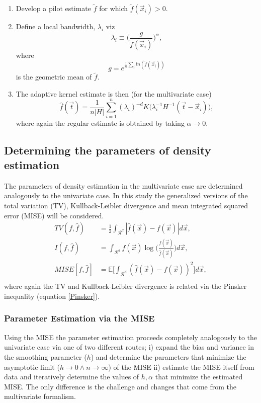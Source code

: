 \documentclass[
twoside,
openright,
titlepage,
numbers=noenddot,
headinclude,%
footinclude=true,
dottedtoc, %
ngerman,
american, %
pagesize=pdftex,
]{book}
\begin{document}
	\begin{enumerate}
		\item Develop a pilot estimate $\tilde{f}$ for which $\tilde{f}(\vec{x}_i)>0$.
		\item Define a local bandwidth, $\lambda_i$ viz
		\begin{equation}
			\lambda_i\equiv \bigg(\frac{g}{\tilde{f}(\vec{x}_i)}\bigg)^\alpha,
		\end{equation}
		where
		\begin{equation}
			g=e^{\frac{1}{n}\sum_{i}ln(\tilde{f}(\vec{x}_i))}
		\end{equation}
		is the geometric mean of $\tilde{f}$.
		\item The adaptive kernel estimate is then (for the multivariate case) 
		\begin{equation}
			\hat{f}(\vec{t})=\frac{1}{n|H|}\sum_{i=1}^n(\lambda_i)^{-d}K\big(\lambda_i^{-1}H^{-1}(\vec{t}-\vec{x}_i)\big),
			\label{rescaled2}
		\end{equation}
		where again the regular estimate is obtained by taking $\alpha\rightarrow 0$.
	\end{enumerate}
	
	\subsection{Determining the parameters of density estimation}
	The parameters of density estimation in the multivariate case are determined analogously to the univariate case. In this study the generalized versions of the total variation (TV), Kullback-Leibler divergence and mean integrated squared error (MISE) will be considered.
	\begin{equation}
		\begin{split}
			TV(f,\hat{f})&=\frac{1}{2}\int_{\mathcal{R}^d} |\hat{f}(\vec{x})-f(\vec{x})|d\vec{x},\\
			I(f,\hat{f})&=\int_{\mathcal{R}^d} f(\vec{x})\log\bigg(\frac{f(\vec{x})}{\hat{f}(\vec{x})}\bigg)d\vec{x},\\
			MISE[f,\hat{f}]&= \mathbb{E}\bigg[\int_{\mathcal{R}^d}(\hat{f}(\vec{x})-f(\vec{x}))^2\bigg]d\vec{x},\\
		\end{split}
	\end{equation}
	where again the TV and Kullback-Leibler divergence is related via the Pinsker inequality (equation \eqref{Pinsker}).
	
	\subsubsection{Parameter Estimation via the MISE}
	Using the MISE the parameter estimation proceeds completely analogously to the univariate case via one of two different routes; i) expand the bias and variance in the smoothing parameter ($h$) and determine the parameters that minimize the asymptotic limit ($h\rightarrow 0\wedge  n\rightarrow \infty$) of the MISE ii) estimate the MISE itself from data and iteratively determine the values of $h,\alpha$ that minimize the estimated MISE. The only difference is the challenge and changes that come from the multivariate formalism.  
	
\end{document}
